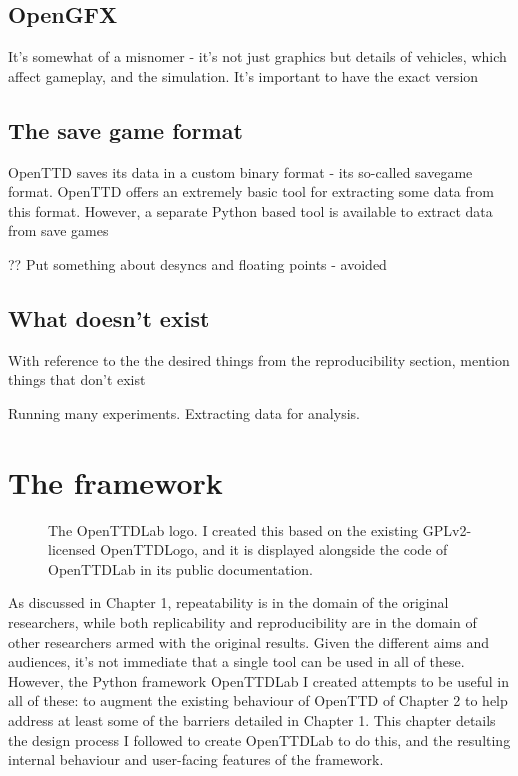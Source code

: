 \documentclass[logo,msc,dsti]{infthesis}    %
\begin{document}
{\section{OpenGFX}

It's somewhat of a misnomer - it's not just graphics but details of vehicles, which affect gameplay, and the simulation. It's important to have the exact version

\section{The save game format}

OpenTTD saves its data in a custom binary format - its so-called savegame format. OpenTTD offers an extremely basic tool for extracting some data from this format. However, a separate Python based tool is available to extract data from save games

?? Put something about desyncs and floating points - avoided

\section{What doesn't exist}

\begin{itemize}
\begin{item}
With reference to the the desired things from the reproducibility section, mention things that don't exist
\end{item}
\end{itemize}

Running many experiments. Extracting data for analysis.

\chapter{The framework}
\label{chapter:openttdlab-design-process-and-features}

\begin{figure}[h]
\centering

\caption{The OpenTTDLab logo. I created this based on the existing GPLv2-licensed OpenTTDLogo, and it is displayed alongside the code of OpenTTDLab in its public documentation.}
\label{fig:openttlab-logo}
\end{figure}

As discussed in Chapter 1, repeatability is in the domain of the original researchers, while both replicability and reproducibility are in the domain of other researchers armed with the original results. Given the different aims and audiences, it's not immediate that a single tool can be used in all of these. However, the Python framework OpenTTDLab I created attempts to be useful in all of these: to augment the existing behaviour of OpenTTD of Chapter 2 to help address at least some of the barriers detailed in Chapter 1. This chapter details the design process I followed to create OpenTTDLab to do this, and the resulting internal behaviour and user-facing features of the framework.

}
\end{document}
